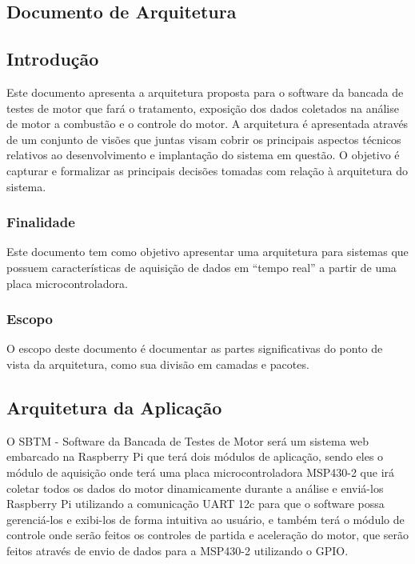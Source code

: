 \begin{anexosenv}
\chapter{Documento de Arquitetura}

\section{Introdução}

Este documento apresenta a arquitetura proposta para o software da bancada de testes de motor que fará o tratamento, exposição dos dados coletados na análise de motor a combustão e o controle do motor. A arquitetura é apresentada através de um conjunto de visões que juntas visam cobrir os principais aspectos técnicos relativos ao desenvolvimento e implantação do sistema em questão. O objetivo é capturar e formalizar as principais decisões tomadas com relação à arquitetura do sistema.

\subsection{Finalidade}

Este documento tem como objetivo apresentar uma arquitetura para sistemas que possuem características de aquisição de dados em “tempo real” a partir de uma placa microcontroladora.

\subsection{Escopo}

O escopo deste documento é documentar as partes significativas do ponto de vista da arquitetura, como sua divisão em camadas e pacotes.

\section{Arquitetura da Aplicação}

O  SBTM - Software da Bancada de Testes de Motor será um sistema web embarcado na Raspberry Pi que terá dois módulos de aplicação, sendo eles o módulo de aquisição onde terá uma placa microcontroladora MSP430-2 que irá coletar todos os dados do motor dinamicamente durante a análise e enviá-los Raspberry Pi utilizando a comunicação UART 12c para que o software possa gerenciá-los e exibi-los de forma intuitiva ao usuário, e também terá o módulo de controle onde serão feitos os controles de partida e aceleração do motor, que serão feitos através de envio de dados para a MSP430-2 utilizando o GPIO.


\end{anexosenv}

